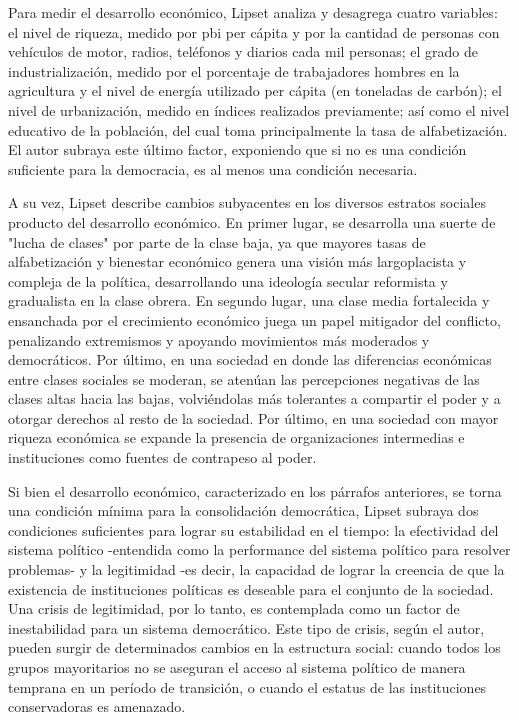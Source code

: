 \documentclass{article}
\begin{document}
Para medir el desarrollo económico, Lipset analiza y desagrega cuatro variables:
el nivel de riqueza, medido por pbi per cápita y por la cantidad de personas con vehículos 
de motor, radios, teléfonos y diarios cada mil personas; el grado de industrialización, 
medido por el porcentaje de trabajadores hombres en la agricultura y el nivel de energía 
utilizado per cápita (en toneladas de carbón); el nivel de urbanización, medido en índices 
realizados previamente; así como el nivel educativo de la población, del cual toma 
principalmente la tasa de alfabetización. El autor subraya este último factor, exponiendo
que si no es una condición suficiente para la democracia, es al menos una condición necesaria.

A su vez, Lipset describe cambios subyacentes en los diversos estratos sociales producto
del desarrollo económico. En primer lugar, se desarrolla una suerte de "lucha de clases" por 
parte de la clase baja, ya que mayores tasas de alfabetización y bienestar económico genera 
una visión más largoplacista y compleja de la política, desarrollando una ideología secular
reformista y gradualista en la clase obrera. En segundo lugar, una clase media fortalecida y 
ensanchada por el crecimiento económico juega un papel mitigador del conflicto, penalizando 
extremismos y apoyando movimientos más moderados y democráticos. Por último, en una sociedad 
en donde las diferencias económicas entre clases sociales se moderan, se atenúan las 
percepciones negativas de las clases altas hacia las bajas, volviéndolas más tolerantes a 
compartir el poder y a otorgar derechos al resto de la sociedad. Por último, en una sociedad 
con mayor riqueza económica se expande la presencia de organizaciones intermedias e 
instituciones como fuentes de contrapeso al poder.

Si bien el desarrollo económico, caracterizado en los párrafos anteriores, se torna una
condición mínima para la consolidación democrática, Lipset subraya dos condiciones 
suficientes para lograr su estabilidad en el tiempo: la efectividad del sistema político 
-entendida como la performance del sistema político para resolver problemas- y la 
legitimidad -es decir, la capacidad de lograr la creencia de que la  existencia de 
instituciones políticas es deseable para el conjunto de la sociedad. Una crisis de 
legitimidad, por lo tanto, es contemplada como un factor de inestabilidad para un sistema 
democrático. Este tipo de crisis, según el autor, pueden surgir de determinados cambios 
en la estructura social: cuando todos los grupos mayoritarios no se aseguran el acceso al 
sistema político de manera temprana en un período de transición, o cuando el estatus de 
las instituciones conservadoras es amenazado.
\end{document}
